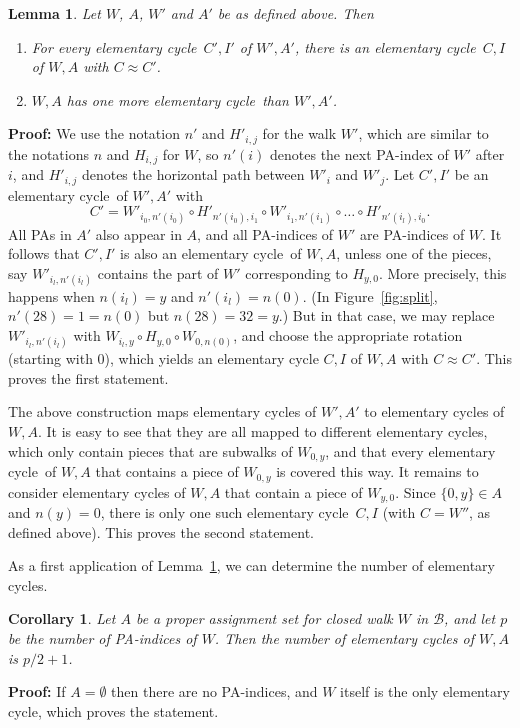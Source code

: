 \documentclass{llncs}
\newcommand{\PF}{{\bf Proof: }}
\newcommand{\QED}{\hspace*{\fill}{$\Box$}\medskip}
\newcommand{\BW}{\mathcal{B}}
\newcommand{\npa}{p}
\newcommand{\elcyc}{elementary cycle}
\newtheorem{lem}[thm]{Lemma}
\newtheorem{corol}[thm]{Corollary}
\begin{document}
\begin{lem}
\label{lem:inductionable}
Let $W$, $A$, $W'$ and $A'$ be as defined above. 
Then
\begin{enumerate}
\item
For every \elcyc\ $C',I'$ of $W',A'$, there is an \elcyc\ $C,I$ of $W,A$ with $C\approx C'$.
\item
$W,A$ has one more \elcyc\ than $W',A'$.
\end{enumerate}
\end{lem} 
\PF
We use the notation $n'$ and $H'_{i,j}$ for the walk $W'$, which are similar to the notations $n$ and $H_{i,j}$ for $W$, so $n'(i)$ denotes the next PA-index of $W'$ after $i$, and $H'_{i,j}$ denotes the horizontal path between $W'_i$ and $W'_j$.
Let $C',I'$ be an \elcyc\ of $W',A'$ with
\[
C'=W'_{i_0,n'(i_0)} \circ H'_{n'(i_0),i_1} \circ W'_{i_1,n'(i_1)} \circ \ldots \circ H'_{n'(i_l),i_0}.
\]
All PAs in $A'$ also appear in $A$, and all PA-indices of $W'$ are PA-indices of $W$. It follows that $C',I'$ is also an \elcyc\ of $W,A$, unless one of the pieces, say $W'_{i_l,n'(i_l)}$ contains the part of $W'$ corresponding to $H_{y,0}$. More precisely, this happens when $n(i_l)=y$ and $n'(i_l)=n(0)$. 
(In Figure~\ref{fig:split}, $n'(28)=1=n(0)$ but $n(28)=32=y$.)
But in that case, we may replace $W'_{i_l,n'(i_l)}$ with $W_{i_l,y} \circ H_{y,0} \circ W_{0,n(0)}$, and choose the appropriate rotation (starting with $0$), which yields an elementary cycle $C,I$ of $W,A$ with $C\approx C'$. This proves the first statement.


The above construction maps \elcyc s of $W',A'$ to \elcyc s of $W,A$. It is easy to see that they are all mapped to different \elcyc s, which only contain pieces that are subwalks of $W_{0,y}$, and that every \elcyc\ of $W,A$ that contains a piece of $W_{0,y}$ is covered this way. It remains to consider \elcyc s of $W,A$ that contain a piece of $W_{y,0}$. Since $\{0,y\}\in A$ and $n(y)=0$, there is only one such \elcyc\ $C,I$ (with $C=W''$, as defined above). This proves the second statement.\QED



As a first application of Lemma~\ref{lem:inductionable}, we can determine the number of \elcyc s.

\begin{corol}
\label{cor:num_elcycs}
Let $A$ be a proper assignment set for closed walk $W$ in $\BW$, and let $\npa$ be the number of PA-indices of $W$. Then the number of elementary cycles of $W,A$ is $\npa/2+1$.
\end{corol}
\PF
If $A=\emptyset$ then there are no PA-indices, and $W$ itself is the only elementary cycle, which proves the statement. 
\end{document}
